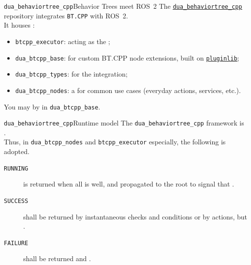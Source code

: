 \begin{frame}{\texttt{dua\_behaviortree\_cpp}}{Behavior Trees meet ROS~2}
  \justifying
  The \href{https://github.com/dotX-Automation/dua_behaviortree_cpp}{\color{blue}\underline{\texttt{dua\_behaviortree\_cpp}}} repository integrates \texttt{BT.CPP} with ROS~2.\\
  \bigskip
  It houses :
  \begin{itemize}
    \item \texttt{btcpp\_executor}:  acting as the ;
    \item \texttt{dua\_btcpp\_base}:  for custom BT.CPP node extensions, built on \href{https://docs.ros.org/en/jazzy/Tutorials/Beginner-Client-Libraries/Pluginlib.html}{\color{blue}\underline{\texttt{pluginlib}}};
    \item \texttt{dua\_btcpp\_types}:  for the integration;
    \item \texttt{dua\_btcpp\_nodes}: a  for common use cases (everyday actions, services, etc.).
  \end{itemize}
  \bigskip
  You may  by  in \texttt{dua\_btcpp\_base}.
\end{frame}
\begin{frame}{\texttt{dua\_behaviortree\_cpp}}{Runtime model}
  The \texttt{dua\_behaviortree\_cpp} framework is .\\
  \bigskip
  Thus, in \texttt{dua\_btcpp\_nodes} and \texttt{btcpp\_executor} especially, the following  is adopted.
  \begin{description}
    \item[\texttt{RUNNING}] is returned when all is well, and propagated to the root to signal that .
    \item[\texttt{SUCCESS}] shall be returned by instantaneous checks and conditions or by actions, but .
    \item[\texttt{FAILURE}] shall be returned  and .
  \end{description}
\end{frame}
